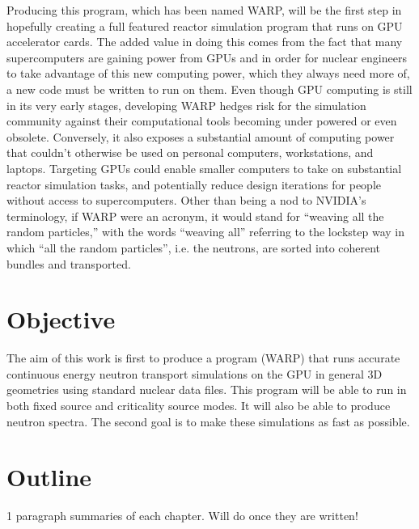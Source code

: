 Producing this program, which has been named WARP, will be the first step in hopefully creating a full featured reactor simulation program that runs on GPU accelerator cards.  The added value in doing this comes from the fact that many supercomputers are gaining power from GPUs and in order for nuclear engineers to take advantage of this new computing power, which they always need more of, a new code must be written to run on them.  Even though GPU computing is still in its very early stages, developing WARP hedges risk for the simulation community against their computational tools becoming under powered or even obsolete.  Conversely, it also exposes a substantial amount of  computing power that couldn't otherwise be used on personal computers, workstations, and laptops.  Targeting GPUs could enable smaller computers to take on substantial reactor simulation tasks, and potentially reduce design iterations for people without access to supercomputers.  Other than being a nod to NVIDIA's terminology, if WARP were an acronym, it would stand for ``weaving all the random particles,'' with the words ``weaving all'' referring to the lockstep way in which ``all the random particles'', i.e. the neutrons, are sorted into coherent bundles and transported.

\section{Objective}

The aim of this work is first to produce a program (WARP) that runs accurate continuous energy neutron transport simulations on the GPU in general 3D geometries using standard nuclear data files.  This program will be able to run in both fixed source and criticality source modes.  It will also be able to produce neutron spectra.  The second goal is to make these simulations as fast as possible.

\section{Outline}

1 paragraph summaries of each chapter.  Will do once they are written!
